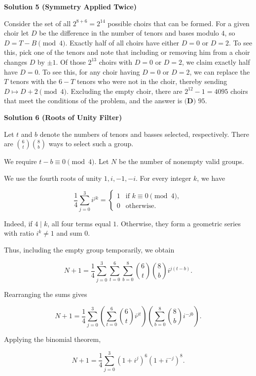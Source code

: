 \begin{enumerate}
 



\textbf{Solution 5 (Symmetry Applied Twice)}

Consider the set of all $2^{8+6}=2^{14}$ possible choirs that can be formed. For a given choir let $D$ be the difference in the number of tenors and bases modulo $4$, so $D = T - B \pmod{4}.$ Exactly half of all choirs have either $D=0$ or $D=2$. To see this, pick one of the tenors and note that including or removing him from a choir changes $D$ by $\pm1$. Of those $2^{13}$ choirs with $D=0$ or $D=2$, we claim exactly half have $D=0$. To see this, for any choir having $D=0$ or $D=2$, we can replace the $T$ tenors with the $6 - T$ tenors who were not in the choir, thereby sending $D \mapsto D + 2 \pmod{4}.$ Excluding the empty choir, there are $2^{12}-1 = 4095$ choirs that meet the conditions of the problem, and the answer is $\boxed{\textbf{(D) } 95}$.

 


 



\textbf{Solution 6 (Roots of Unity Filter)}

Let $t$ and $b$ denote the numbers of tenors and basses selected, respectively. There are $\binom{6}{t}\binom{8}{b}$ ways to select such a group.

 We require $t-b\equiv 0\pmod{4}$. Let $N$ be the number of nonempty valid groups.

 We use the fourth roots of unity $1,i,-1,-i$. For every integer $k$, we have

 
 \[\frac14\sum_{j=0}^{3}i^{jk}=\begin{cases}1 & \text{if }k\equiv0\pmod4,\\0 & \text{otherwise}.\end{cases}\]

 Indeed, if $4\mid k$, all four terms equal $1$. Otherwise, they form a geometric series with ratio $i^k\ne1$ and sum $0$.

 Thus, including the empty group temporarily, we obtain

 
 \[N+1=\frac14\sum_{j=0}^{3}\sum_{t=0}^{6}\sum_{b=0}^{8}\binom6t\binom8b i^{j(t-b)}.\]

 Rearranging the sums gives

 
 \[N+1=\frac14\sum_{j=0}^{3}\left(\sum_{t=0}^{6}\binom6t i^{jt}\right)\left(\sum_{b=0}^{8}\binom8b i^{-jb}\right).\]

 Applying the binomial theorem,

 
 \[N+1=\frac14\sum_{j=0}^{3}(1+i^j)^6(1+i^{-j})^8.\]


\end{enumerate}
